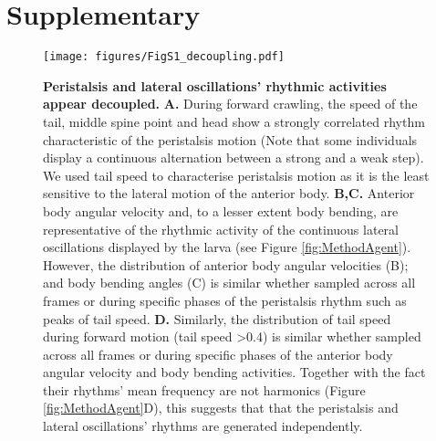 



\section{Supplementary}
\beginsupplement


\begin{figure}
\begin{center}
\texttt{[image: figures/FigS1\_decoupling.pdf]}
\caption{{\bf Peristalsis and lateral oscillations’ rhythmic activities appear decoupled.} {\bf A.} During forward crawling, the speed of the tail, middle spine point and head show a strongly correlated rhythm characteristic of the peristalsis motion (Note that some individuals display a continuous alternation between a strong and a weak step). We used tail speed to characterise peristalsis motion as it is the least sensitive to the lateral motion of the anterior body.
{\bf B,C.} Anterior body angular velocity and, to a lesser extent body bending, are representative of the rhythmic activity of the continuous lateral oscillations displayed by the larva (see Figure \ref{fig:MethodAgent}). However, the distribution of anterior body angular velocities (B); and body bending angles (C) is similar whether sampled across all frames or during specific phases of the peristalsis rhythm such as peaks of tail speed. {\bf D.} Similarly, the distribution of tail speed during forward motion (tail speed >0.4) is similar whether sampled across all frames or during specific phases of the anterior body angular velocity and body bending activities. Together with the fact their rhythms’ mean frequency are not harmonics (Figure \ref{fig:MethodAgent}D), this suggests that that the peristalsis and lateral oscillations’ rhythms are generated independently. 
 \label{fig:FigS2}}
\end{center}
\end{figure}





